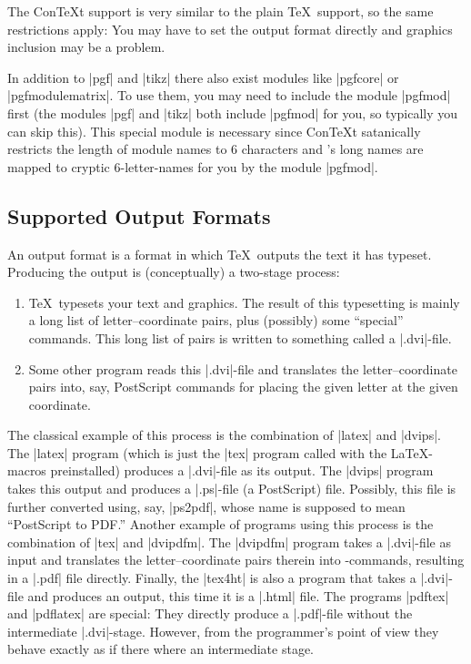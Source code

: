 The Con\TeX t support is very similar to the plain \TeX\ support, so
the same restrictions apply: You may have to set the output
format directly and graphics inclusion may be a problem.

In addition to |pgf| and |tikz| there also exist modules like
|pgfcore| or |pgfmodulematrix|. To
use them, you may need to include the module |pgfmod| first (the
modules |pgf| and |tikz| both include |pgfmod| for you, so typically
you can skip this). This special module is necessary since Con\TeX t
satanically restricts the length of module names to 6 characters
and \pgfname's long names are mapped
to cryptic 6-letter-names for you by the module |pgfmod|.





\subsection{Supported Output Formats}
\label{section-drivers}

An output format is a format in which \TeX\ outputs the text it has
typeset. Producing the output is (conceptually) a two-stage process:
\begin{enumerate}
\item
  \TeX\ typesets your text and graphics. The result of this
  typesetting is mainly a long list of letter--coordinate pairs, plus 
  (possibly) some ``special'' commands. This long list of pairs
  is written to something called a |.dvi|-file.
\item
  Some other program reads this |.dvi|-file and translates the
  letter--coordinate pairs into, say, PostScript commands for placing
  the given letter at the given coordinate.
\end{enumerate}

The classical example of this process is the combination of |latex|
and |dvips|. The |latex| program (which is just the |tex| program
called with the \LaTeX-macros preinstalled) produces a |.dvi|-file as
its output. The |dvips| program takes this output and produces a
|.ps|-file (a PostScript) file. Possibly, this file is further
converted using, say, |ps2pdf|, whose name is supposed to mean
``PostScript to PDF.'' Another example of programs using this
process is the combination of |tex| and |dvipdfm|. The |dvipdfm|
program takes a |.dvi|-file as 
input and translates the letter--coordinate pairs therein into
\pdf-commands, resulting in a |.pdf| file directly. Finally, the
|tex4ht| is also a program that takes a |.dvi|-file and produces an
output, this time it is a |.html| file. The programs |pdftex| and
|pdflatex| are special: They directly produce a |.pdf|-file without
the intermediate |.dvi|-stage. However, from the programmer's point of
view they behave exactly as if there where an intermediate stage.

